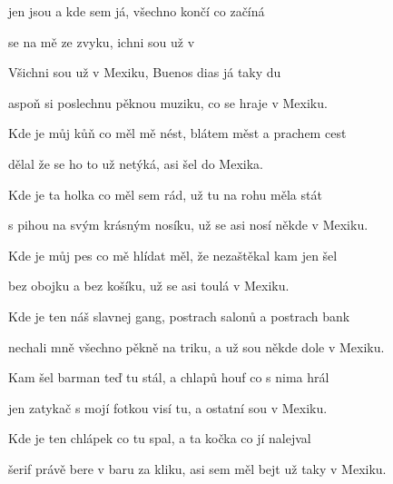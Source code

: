 

\zs
{} jen jsou a kde sem já,  všechno končí co začíná

 se na mě  ze zvyku, ichni sou už v 
\ks

\zr
Všichni sou už v Mexiku, Buenos dias já taky du

aspoň si poslechnu pěknou muziku, co se hraje v Mexiku.
\kr

\zs
Kde je můj kůň co měl mě nést, blátem měst a prachem cest

dělal že se ho to už netýká, asi šel do Mexika.
\ks

\zs
Kde je ta holka co měl sem rád, už tu na rohu měla stát

s pihou na svým krásným nosíku, už se asi nosí někde v Mexiku.
\ks

\zr
\kr

\zs
Kde je můj pes co mě hlídat měl, že nezaštěkal kam jen šel

bez obojku a bez košíku, už se asi toulá v Mexiku.
\ks

\zs
Kde je ten náš slavnej gang, postrach salonů a postrach bank

nechali mně všechno pěkně na triku, a už sou někde dole v Mexiku.
\ks

\zr
\kr



\zs
Kam šel barman teď tu stál, a chlapů houf co s nima hrál

jen zatykač s mojí fotkou visí tu, a ostatní sou v Mexiku.
\ks

\zs
Kde je ten chlápek co tu spal, a ta kočka co jí nalejval

šerif právě bere v baru za kliku, asi sem měl bejt už taky v Mexiku.
\ks

\zr\kr \zr\kr


\kp

